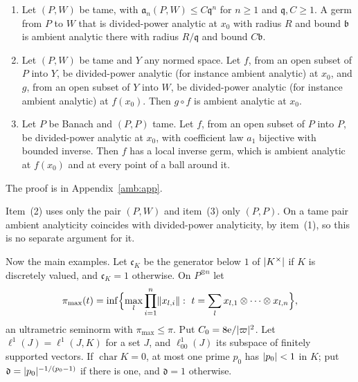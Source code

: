 \begin{theorem}\label{amb:thm:tame-calculus}
\begin{enumerate}
\item Let $(P,W)$ be tame, with $\mathfrak a_n(P,W)\le C\mathfrak q^n$ for $n\ge1$ and $\mathfrak q,C\ge1$. A germ from $P$ to $W$ that is divided-power analytic at $x_0$ with radius $R$ and bound $\mathfrak b$ is ambient analytic there with radius $R/\mathfrak q$ and bound $C\mathfrak b$.
\item Let $(P,W)$ be tame and $Y$ any normed space. Let $f$, from an open subset of $P$ into $Y$, be divided-power analytic (for instance ambient analytic) at $x_0$, and $g$, from an open subset of $Y$ into $W$, be divided-power analytic (for instance ambient analytic) at $f(x_0)$. Then $g\circ f$ is ambient analytic at $x_0$.
\item Let $P$ be Banach and $(P,P)$ tame. Let $f$, from an open subset of $P$ into $P$, be divided-power analytic at $x_0$, with coefficient law $a_1$ bijective with bounded inverse. Then $f$ has a local inverse germ, which is ambient analytic at $f(x_0)$ and at every point of a ball around it.
\end{enumerate}
\end{theorem}
The proof is in Appendix~\ref{amb:app}.

Item~(2) uses only the pair $(P,W)$ and item~(3) only $(P,P)$. On a tame pair ambient analyticity coincides with divided-power analyticity, by item~(1), so this is no separate argument for it.

Now the main examples. Let $\mathfrak c_K$ be the generator below $1$ of $\lvert K^\times\rvert$ if $K$ is discretely valued, and $\mathfrak c_K=1$ otherwise. On $P^{\otimes n}$ let
\[
 \pi_{\max}(t)=\inf\Bigl\{\max_l\prod_{i=1}^n\norm{x_{l,i}}:\ t=\sum_lx_{l,1}\otimes\dots\otimes x_{l,n}\Bigr\},
\]
an ultrametric seminorm with $\pi_{\max}\le\pi$. Put $C_0=8\mathrm e/\lvert \varpi\rvert^2$. Let $\ell^1(J)=\ell^1(J,K)$ for a set $J$, and $\ell^1_{00}(J)$ its subspace of finitely supported vectors. If $\operatorname{char}K=0$, at most one prime $p_0$ has $\lvert p_0\rvert<1$ in $K$; put $\mathfrak d=\lvert p_0\rvert^{-1/(p_0-1)}$ if there is one, and $\mathfrak d=1$ otherwise.

